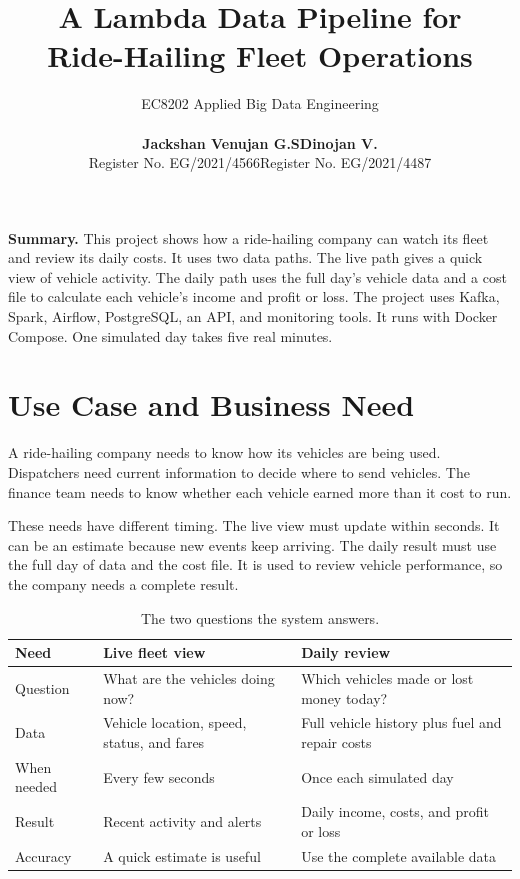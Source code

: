 \documentclass[11pt,a4paper]{article}
\title{\vspace{-1.1cm}\textbf{A Lambda Data Pipeline for\\Ride-Hailing Fleet Operations}}
\author{EC8202 Applied Big Data Engineering\\[8pt]
\normalsize
\begin{tabular}{cc}
\textbf{Jackshan Venujan G.S} & \textbf{Dinojan V.}\\
Register No. EG/2021/4566 & Register No. EG/2021/4487
\end{tabular}}
\date{}
\begin{document}
\maketitle
\thispagestyle{fancy}

\vspace{-0.5cm}
\begin{center}
\begin{minipage}{0.94\textwidth}\small
\color{ink}\textbf{Summary.}
This project shows how a ride-hailing company can watch its fleet and review its daily costs.
It uses two data paths. The live path gives a quick view of vehicle activity. The daily path uses
the full day's vehicle data and a cost file to calculate each vehicle's income and profit or loss.
The project uses Kafka, Spark, Airflow, PostgreSQL, an API, and monitoring tools. It runs with
Docker Compose. One simulated day takes five real minutes.
\end{minipage}
\end{center}

\vspace{0.25cm}
\tableofcontents
\vspace{0.35cm}

\section{Use Case and Business Need}

A ride-hailing company needs to know how its vehicles are being used. Dispatchers need current
information to decide where to send vehicles. The finance team needs to know whether each vehicle
earned more than it cost to run.

These needs have different timing. The live view must update within seconds. It can be an estimate
because new events keep arriving. The daily result must use the full day of data and the cost file.
It is used to review vehicle performance, so the company needs a complete result.

\begin{table}[htbp]\centering\small
\caption{The two questions the system answers.}
\begin{tabularx}{\textwidth}{@{}p{3.0cm}XX@{}}
\toprule
\textbf{Need} & \textbf{Live fleet view} & \textbf{Daily review}\\
\midrule
Question & What are the vehicles doing now? & Which vehicles made or lost money today?\\
Data & Vehicle location, speed, status, and fares & Full vehicle history plus fuel and repair costs\\
When needed & Every few seconds & Once each simulated day\\
Result & Recent activity and alerts & Daily income, costs, and profit or loss\\
Accuracy & A quick estimate is useful & Use the complete available data\\
\bottomrule
\end{tabularx}
\end{table}
\end{document}
